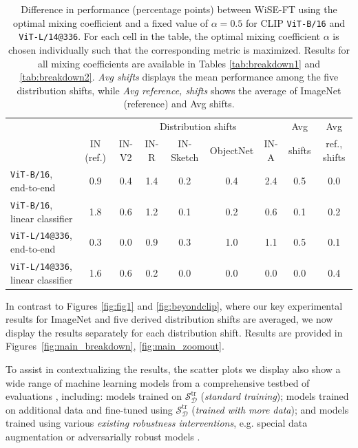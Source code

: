 \begin{table}
\setlength\tabcolsep{5.1pt}
\small
\begin{center}
\begin{tabular}{lc|ccccc|cc}
\toprule
{} &            &             \multicolumn{5}{c|}{Distribution shifts}             & Avg &     Avg\\
{} &           IN (ref.) &             IN-V2 &              IN-R &                 IN-Sketch &                 ObjectNet &              IN-A & shifts &     ref., shifts\\
\midrule
\texttt{ViT-B/16}, end-to-end & 0.9 & 0.4 & 1.4 & 0.2 & 0.4 & 2.4 & 0.5 & 0.0 \\
\texttt{ViT-B/16}, linear classifier & 1.8 & 0.6 & 1.2 & 0.1 & 0.2 & 0.6 & 0.1 & 0.2 \\
\texttt{ViT-L/14@336}, end-to-end & 0.3 & 0.0 & 0.9 & 0.3 & 1.0 & 1.1 & 0.5 & 0.1 \\
\texttt{ViT-L/14@336}, linear classifier & 1.6 & 0.6 & 0.2 & 0.0 & 0.0 & 0.0 & 0.0 & 0.4 \\
\bottomrule
\end{tabular}
\caption{\label{tab:alpha}
Difference in performance (percentage points) between WiSE-FT using the optimal mixing coefficient and a fixed value of $\alpha{=}0.5$ for CLIP \texttt{ViT-B/16} and \texttt{ViT-L/14@336}. For each cell in the table, the optimal mixing coefficient $\alpha$ is chosen individually such that the corresponding metric is maximized.
Results for all mixing coefficients are available in Tables \ref{tab:breakdown1} and \ref{tab:breakdown2}. \textit{Avg shifts} displays the mean performance among the five distribution shifts, while \textit{Avg reference, shifts} shows the average of ImageNet (reference) and Avg shifts.
}
\end{center}
\end{table}

In contrast to Figures \ref{fig:fig1} and \ref{fig:beyondclip}, where our key experimental results for ImageNet and five derived distribution shifts are averaged, we now display the results separately for each distribution shift. Results are provided in Figures~\ref{fig:main_breakdown}, \ref{fig:main_zoomout}. 

To assist in contextualizing the results, the scatter plots we display also show a wide range of machine learning models from a comprehensive testbed of evaluations \cite{taori2020measuring, miller21b}, including:
models trained on $\mathcal{S}^\text{tr}_\mathcal{D}$ (\textit{standard training}); models trained on additional data and fine-tuned using $\mathcal{S}^\text{tr}_\mathcal{D}$  
(\textit{trained with more data}); and models trained using various \textit{existing robustness interventions}, e.g. special data augmentation 
\cite{devries2017improved,engstrom2019exploring,geirhos2018imagenet,hendrycks2019augmix} or adversarially robust models \cite{madry2017towards, cohen2019certified,salman2019provably,shafahi2019adversarial}.

